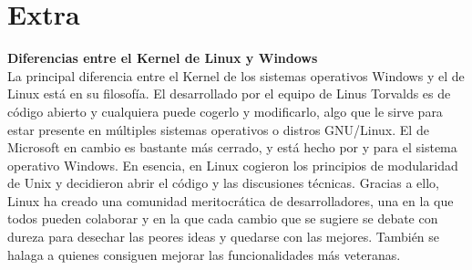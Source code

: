 \documentclass[a4paper, 11pt, oneside]{article}
\begin{document}
\section*{Extra}
\textbf{Diferencias entre el Kernel de Linux y Windows}\\
La principal diferencia entre el Kernel de los sistemas operativos Windows y el de Linux está en su filosofía. El desarrollado por el equipo de Linus Torvalds es de código abierto y cualquiera puede cogerlo y modificarlo, algo que le sirve para estar presente en múltiples sistemas operativos o distros GNU/Linux. El de Microsoft en cambio es bastante más cerrado, y está hecho por y para el sistema operativo Windows. En esencia, en Linux cogieron los principios de modularidad de Unix y decidieron abrir el código y las discusiones técnicas. Gracias a ello, Linux ha creado una comunidad meritocrática de desarrolladores, una en la que todos pueden colaborar y en la que cada cambio que se sugiere se debate con dureza para desechar las peores ideas y quedarse con las mejores. También se halaga a quienes consiguen mejorar las funcionalidades más veteranas.
\end{document}
